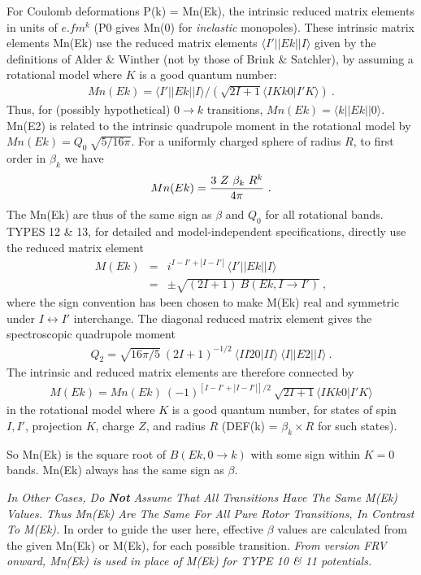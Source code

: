 \documentclass[11pt]{article}
\newcommand{\beqn}{\begin{eqnarray}}
\newcommand{\eeqn}{\end{eqnarray}}
\begin{document}
For Coulomb deformations P(k) = Mn(Ek), the intrinsic reduced matrix elements
in units of $e.fm^k$  (P0 gives Mn(0) for {\em inelastic} monopoles).
These intrinsic matrix elements Mn(Ek)  use
the reduced matrix elements $\langle I ' || Ek || I \rangle$ given by the
definitions of Alder \& Winther (not by those of Brink \& Satchler),
by assuming a rotational model where $K$ is a good quantum number:
 \beqn
  Mn(Ek) = \langle I ' || Ek || I \rangle
                     / (\sqrt {2I+1}  \langle IK k0 | I ' K \rangle ) \ .
  \eeqn
Thus, for (possibly hypothetical) $0 \rightarrow k$ transitions, $ Mn(Ek)= \langle k || Ek || 0 \rangle$.\\
Mn(E2) is related to the intrinsic quadrupole moment in the rotational model by
$Mn(Ek) = Q _ 0 ~ \sqrt {5 / {16 \pi}}$.
For a uniformly charged sphere of radius $R$, to first order in $\beta_k$ we have
\beqn
  Mn(Ek) = {{3 ~ Z ~ \beta _ k ~ R^k} \over {4 \pi}}  \ .
\eeqn
The Mn(Ek) are thus of the same sign as $\beta$ and $Q_{0}$ for all rotational
bands.
\\
\bigskip
TYPES 12 \& 13, for detailed and model-independent specifications,
directly use the reduced matrix element
\beqn
  M(Ek) & = &i^{ I-I ' + |I-I ' | } ~ \langle I ' || Ek || I \rangle \\
     & =& \pm \sqrt{ (2I+1) ~ B(Ek, I \rightarrow I ' ) } \ ,
\eeqn
where the sign convention has been chosen to make M(Ek) real and symmetric under $I \leftrightarrow I'$ interchange.
The diagonal reduced matrix element gives the spectroscopic quadrupole moment
\beqn
Q_2 = \sqrt {{16 \pi} /5} ~ (2I+1)^{-1/2} ~ \langle II 20 | II \rangle ~\langle I || E2 || I \rangle \ .
\eeqn
The intrinsic and reduced matrix elements are therefore connected by
\beqn
 M(Ek) = Mn(Ek) ~ (-1)^{ [I-I ' +|I-I ' |]/2} ~ \sqrt{2I+1}  \langle IK k0 | I ' K \rangle
\eeqn
  in the rotational model where $K$ is a good quantum number,
 for states of spin $I,I'$, projection $K$, charge $Z$, and radius $R$
(DEF(k) = $\beta_k \times R$ for such states).

So Mn(Ek) is the square root of $B(Ek, 0 \rightarrow k)$ with some sign
within $K=0$ bands. Mn(Ek) always has the same sign as $\beta$.

{\em
In Other Cases, Do {\bf Not} Assume That All Transitions Have The Same M(Ek) Values.
Thus Mn(Ek) Are The Same For All Pure Rotor Transitions, In Contrast To
M(Ek).}
In order to guide the user here,
effective $\beta$ values are calculated from the given Mn(Ek) or M(Ek), for
each possible transition.
{\em From version FRV onward, Mn(Ek) is used in place of M(Ek) for TYPE
10 \& 11 potentials.}
\end{document}
